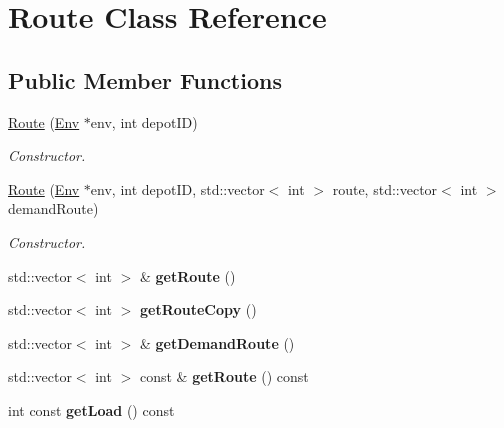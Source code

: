 \hypertarget{class_route}{}\section{Route Class Reference}
\label{class_route}
\subsection*{Public Member Functions}
\begin{DoxyCompactItemize}
\item 
\hyperlink{class_route_a7b0add29f3255cd109649ca25db20d8d}{Route} (\hyperlink{class_env}{Env} $\ast$env, int depot\+ID)
\begin{DoxyCompactList}\small\item\em Constructor. \end{DoxyCompactList}\item 
\hyperlink{class_route_a95a55c89846e5e183b1749a8507275d5}{Route} (\hyperlink{class_env}{Env} $\ast$env, int depot\+ID, std\+::vector$<$ int $>$ route, std\+::vector$<$ int $>$ demand\+Route)
\begin{DoxyCompactList}\small\item\em Constructor. \end{DoxyCompactList}\item 
\mbox{\label{class_route_a9a12c02d891924f0050d3d6bc7af1e18}} 
std\+::vector$<$ int $>$ \& {\bfseries get\+Route} ()
\item 
\mbox{\label{class_route_adbff1ea9d40933cbb79886efd758ef0c}} 
std\+::vector$<$ int $>$ {\bfseries get\+Route\+Copy} ()
\item 
\mbox{\label{class_route_a3c342e45335d32de6f7019e4cc8ff5ca}} 
std\+::vector$<$ int $>$ \& {\bfseries get\+Demand\+Route} ()
\item 
\mbox{\label{class_route_a151bbafcfc1afd47bda7c2b6c6567c1e}} 
std\+::vector$<$ int $>$ const  \& {\bfseries get\+Route} () const
\item 
\mbox{\label{class_route_abdde0209de6671eac1fabd237804ff19}} 
int const {\bfseries get\+Load} () const
\item 
\mbox{\label{class_route_a5326c0234e1ed102bf9f8cf8236de8bd}} 

\end{DoxyCompactItemize}

